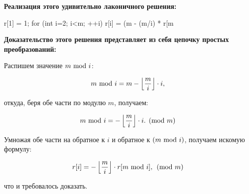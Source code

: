 \bf{Реализация} этого удивительно лаконичного решения:

\code
r[1] = 1;
for (int i=2; i<m; ++i)
	r[i] = (m - (m/i) * r[m%
\endcode

\bf{Доказательство} этого решения представляет из себя цепочку простых преобразований:

Распишем значение $m {\rm~mod~} i$:

$$ m {\rm~mod~} i = m - \left\lfloor \frac{m}{i} \right\rfloor \cdot i, $$

откуда, беря обе части по модулю $m$, получаем:

$$ m {\rm~mod~} i = - \left\lfloor \frac{m}{i} \right\rfloor \cdot i. \pmod m $$

Умножая обе части на обратное к $i$ и обратное к $(m {\rm~mod~} i)$, получаем искомую формулу:

$$ r[i] = - \left\lfloor \frac{m}{i} \right\rfloor \cdot r[m {\rm~mod~} i], \pmod m $$

что и требовалось доказать.
